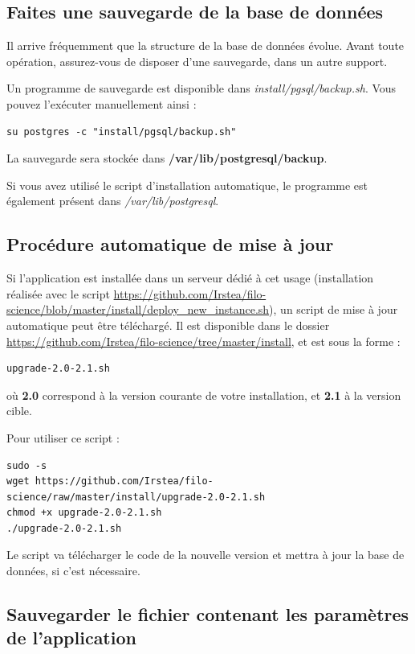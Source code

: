 \subsection{Faites une sauvegarde de la base de données}
Il arrive fréquemment que la structure de la base de données évolue. Avant toute opération, assurez-vous de disposer d'une sauvegarde, dans un autre support.

Un programme de sauvegarde est disponible dans \textit{install/pgsql/backup.sh}. Vous pouvez l'exécuter manuellement ainsi :
\begin{lstlisting}
su postgres -c "install/pgsql/backup.sh"
\end{lstlisting}

La sauvegarde sera stockée dans \textbf{/var/lib/postgresql/backup}.

Si vous avez utilisé le script d'installation automatique, le programme est également présent dans \textit{/var/lib/postgresql}.

\subsection{Procédure automatique de mise à jour}

Si l'application est installée dans un serveur dédié à cet usage (installation réalisée avec le script \href{https://github.com/Irstea/filo-science/blob/master/install/deploy_new_instance.sh}{https://github.com/Irstea/filo-science/blob/master/install/deploy\_new\_instance.sh}), un script de mise à jour automatique peut être téléchargé. Il est disponible dans le dossier\\ \href{https://github.com/Irstea/filo-science/tree/master/install}{https://github.com/Irstea/filo-science/tree/master/install}, et est sous la forme :
\begin{lstlisting}
upgrade-2.0-2.1.sh
\end{lstlisting}
où \textbf{2.0} correspond à la version courante de votre installation, et \textbf{2.1} à la version cible.

Pour utiliser ce script :
\begin{lstlisting}
sudo -s
wget https://github.com/Irstea/filo-science/raw/master/install/upgrade-2.0-2.1.sh
chmod +x upgrade-2.0-2.1.sh
./upgrade-2.0-2.1.sh
\end{lstlisting}

Le script va télécharger le code de la nouvelle version et mettra à jour la base de données, si c'est nécessaire.

\subsection{Sauvegarder le fichier contenant les paramètres de l'application}


